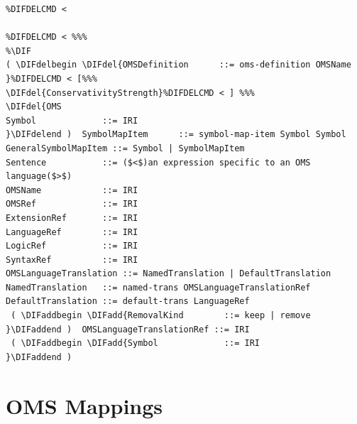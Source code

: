 \documentclass[10pt,fleqn,final]{scrreprt}
\newcommand*{\syntax}[1]{\texttt{#1}}
\newcommand{\sclause}[1]{\section{#1}}
\providecommand{\DIFadd}[1]{{\protect\color{blue}\uwave{#1}}} %
\providecommand{\DIFdel}[1]{{\protect\color{red}\sout{#1}}}                      %
\providecommand{\DIFaddbegin}{} %
\providecommand{\DIFaddend}{} %
\providecommand{\DIFdelbegin}{} %
\providecommand{\DIFdelend}{} %
\begin{document}


\begin{lstlisting}[language=ebnf,escapeinside={()}]  %%%
%DIF <  abstract syntax
%DIFDELCMD < 

%DIFDELCMD < %%%
%\DIF
( \DIFdelbegin \DIFdel{OMSDefinition      ::= oms-definition OMSName }%DIFDELCMD < [%%%
\DIFdel{ConservativityStrength}%DIFDELCMD < ] %%%
\DIFdel{OMS
Symbol             ::= IRI
}\DIFdelend )  SymbolMapItem      ::= symbol-map-item Symbol Symbol
GeneralSymbolMapItem ::= Symbol | SymbolMapItem
Sentence           ::= ($<$)an expression specific to an OMS language($>$) 
OMSName            ::= IRI
OMSRef             ::= IRI
ExtensionRef       ::= IRI
LanguageRef        ::= IRI
LogicRef           ::= IRI
SyntaxRef          ::= IRI
OMSLanguageTranslation ::= NamedTranslation | DefaultTranslation
NamedTranslation   ::= named-trans OMSLanguageTranslationRef
DefaultTranslation ::= default-trans LanguageRef
 ( \DIFaddbegin \DIFadd{RemovalKind        ::= keep | remove
}\DIFaddend )  OMSLanguageTranslationRef ::= IRI
 ( \DIFaddbegin \DIFadd{Symbol             ::= IRI
}\DIFaddend )
\end{lstlisting}

\sclause{OMS Mappings}
\end{document}
